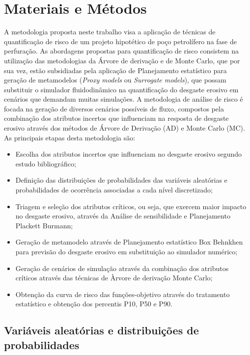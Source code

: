 \chapter{Materiais e Métodos}


A metodologia proposta neste trabalho visa a aplicação de técnicas de quantificação
de risco de um projeto hipotético de poço petrolífero na fase de perfuração. As abordagens propostas para quantificação de risco consistem na utilização das metodologias da Árvore de derivação e de Monte Carlo, que por sua vez, estão subsidiadas pela aplicação de Planejamento estatístico para geração de metamodelos (\textit{Proxy models} ou \textit{Surrogate models}), que possam substituir o simulador fluidodinâmico na quantificação do desgaste erosivo em cenários que demandam muitas simulações.
A metodologia de análise de risco é focada na geração de diversos cenários possíveis de fluxo, compostos pela combinação dos atributos incertos que influenciam na resposta de desgaste erosivo através dos métodos de Árvore de Derivação (AD) e Monte Carlo (MC). As principais etapas desta metodologia são:

\begin{itemize}
  \item Escolha dos atributos incertos que influenciam no desgaste erosivo segundo estudo bibliográfico;
  \item Definição das distribuições de probabilidades das variáveis aleatórias e probabilidades de ocorrência associadas a cada nível discretizado;
  \item Triagem e seleção dos atributos críticos, ou seja, que exercem maior impacto no desgaste erosivo, através da Análise de sensibilidade e Planejamento Plackett Burmann;
  \item Geração de metamodelo através de Planejamento estatístico Box Behnkhen para previsão do desgaste erosivo em substituição ao simulador numérico;
  \item Geração de cenários de simulação através da combinação dos atributos críticos através das técnicas de Àrvore de derivação Monte Carlo;
  \item Obtenção da curva de risco das funções-objetivo através do tratamento estatístico e
obtenção dos percentis P10, P50 e P90. 
\end{itemize}

\section{Variáveis aleatórias e distribuições de probabilidades}
\label{cap:Variáveis aleatórias e distribuições de probabilidades}

